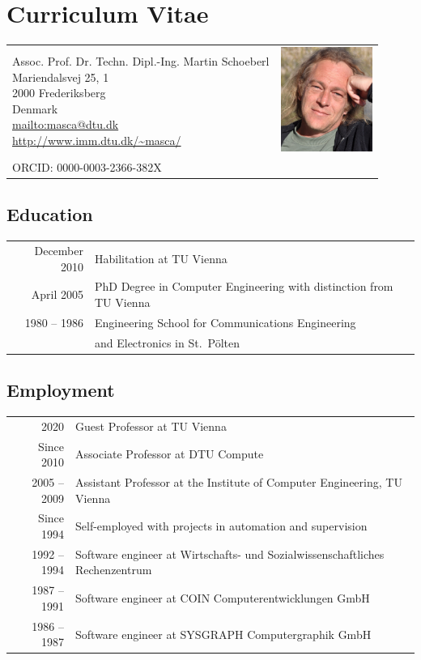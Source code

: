 \documentclass[%
    a4paper,
    11pt, %
    headinclude, footexclude,
    notitlepage,
    headsepline,
    pointlessnumbers,
    ]{scrartcl}
\begin{document}
\newpage

\section*{Curriculum Vitae}


\begin{tabular*}{0.7\textwidth}[h!]{@{\extracolsep{\fill} } l r}
\parbox[b]{11 cm}{Assoc. Prof. Dr. Techn. Dipl.-Ing. Martin Schoeberl\\
Mariendalsvej 25, 1\\
2000 Frederiksberg\\
Denmark\\
\url{mailto:masca@dtu.dk}\\
\url{http://www.imm.dtu.dk/~masca/}} &
\includegraphics[width=3cm]{martin_small}\\
ORCID: 0000-0003-2366-382X
\end{tabular*}

\subsection*{Education}

\begin{tabular}{rl}
December 2010 & Habilitation at TU Vienna \\
April 2005   & PhD Degree in Computer Engineering with distinction from TU Vienna\\
1980 -- 1986 & Engineering School for Communications Engineering\\
              & and Electronics in St.\ P\"olten\\
\end{tabular}

\subsection*{Employment}
\begin{tabular}{rl}
 2020 & Guest Professor at TU Vienna\\
Since 2010    & Associate Professor at DTU Compute\\
2005 -- 2009 & Assistant Professor at the Institute of Computer Engineering, TU Vienna\\
Since 1994   & Self-employed with projects in automation and supervision\\
1992 -- 1994 & Software engineer at Wirtschafts- und Sozialwissenschaftliches Rechenzentrum\\
1987 -- 1991 & Software engineer at COIN Computerentwicklungen GmbH\\
1986 -- 1987 & Software engineer at SYSGRAPH Computergraphik GmbH\\
\end{tabular}
\end{document}
